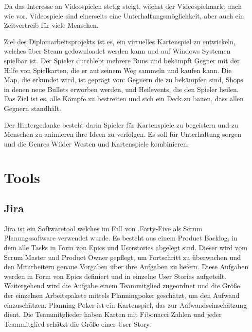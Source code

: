 
%
Da das Interesse an Videospielen stetig steigt, wächst der Videospielmarkt nach wie vor. Videospiele sind einerseits eine Unterhaltungsmöglichkeit, aber auch ein Zeitvertreib für viele Menschen.

Ziel des Diplomarbeitsprojekts ist es, ein virtuelles Kartenspiel zu entwickeln, welches über Steam gedownloadet werden kann und auf Windows Systemen spielbar ist. Der Spieler durchlebt mehrere Runs und bekämpft Gegner mit der Hilfe von Spielkarten, die er auf seinem Weg sammeln und kaufen kann. Die Map, die erkundet wird, ist geprägt von: Gegnern die zu bekämpfen sind, Shops in denen neue Bullets erworben werden, und Heilevents, die den Spieler heilen. Das Ziel ist es, alle Kämpfe zu bestreiten und sich ein Deck zu bauen, dass allen Gegnern standhält.

Der Hintergedanke besteht darin Spieler für Kartenspiele zu begeistern und zu Menschen zu animieren ihre Ideen zu verfolgen. Es soll für Unterhaltung sorgen und die Genres Wilder Westen und Kartenspiele kombinieren.
%


\section{Tools}\label{sec:tools}

\renewcommand{\kapitelautor}{Autor: Irgendwer} %

\subsection{Jira}\label{subsec:jira}
%
Jira ist ein Softwaretool welches im Fall von .Forty-Five als Scrum Planungssoftware verwendet wurde.
Es besteht aus einem Product Backlog, in dem alle Tasks in Form von Epics und Userstories abgelegt sind.
Dieser wird vom Scrum Master und Product Owner gepflegt, um Fortschritt zu überwachen und den Mitarbeitern genaue Vorgaben über ihre Aufgaben zu liefern.
Diese Aufgaben werden in Form von Epics definiert und in einzelne User Stories aufgeteilt.
Weitergehend wird die Aufgabe einem Teammitglied zugeordnet und die Größe der einzelnen Arbeitspakete mittels Planningpoker geschätzt, um den Aufwand einzuschätzen.
Planning Poker ist ein Kartenspiel, das zur Aufwandseinschätzung dient. Die Teammitglieder haben Karten mit Fibonacci Zahlen und jeder Teammitglied schätzt die Größe einer User Story.



